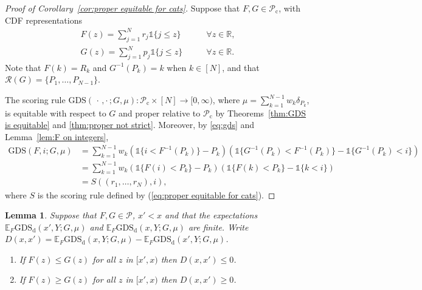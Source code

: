 \documentclass[10pt]{article} %
\theoremstyle{theorem}
\newtheorem{lem}{Lemma}
\theoremstyle{definition}
\newcommand{\RRR}{\mathbb{R}}
\newcommand{\EEE}{\mathbb{E}}
\newcommand{\one}{\mathds{1}}
\newcommand{\GDS}{\mathrm{GDS}}
\newcommand{\GDSd}{\mathrm{GDS}_\mathrm{d}}
\newcommand{\RG}{\mathcal{R}(G)}
\newcommand{\twocdots}{\,\cdot\,,\cdot\,}
\begin{document}
\begin{proof}[Proof of Corollary~\ref{cor:proper equitable for cats}]
Suppose that $F,G\in\mathcal{P}_\mathrm{c}$, with CDF representations
\begin{align*}
F(z)=\sum_{j=1}^N r_j\one\{j\leq z\} \qquad &\forall z\in \RRR, \\
G(z)=\sum_{j=1}^N p_j\one\{j\leq z\} \qquad &\forall z\in \RRR.
\end{align*}
Note that $F(k)=R_k$ and $G^{-1}(P_k)=k$ when $k\in [N]$, and that $\RG=\{P_1,\ldots,P_{N-1}\}$.

The scoring rule $\GDS(\twocdots;G,\mu):\mathcal{P}_\mathrm{c}\times[N]\to[0,\infty)$, where $\mu=\sum_{k=1}^{N-1} w_k\delta_{P_k}$, is equitable with respect to $G$ and proper relative to $\mathcal{P}_\mathrm{c}$ by Theorems~\ref{thm:GDS is equitable} and \ref{thm:proper not strict}. Moreover, by \eqref{eq:gds} and Lemma~\ref{lem:F on integers},
\begin{align*}
\GDS(F,i;G,\mu)
&=\sum_{k=1}^{N-1} w_k(\one\{i<F^{-1}(P_k)\} - P_k)(\one\{G^{-1}(P_k)<F^{-1}(P_k)\} - \one\{G^{-1}(P_k)<i\}) \\
&=\sum_{k=1}^{N-1} w_k(\one\{F(i)<P_k\} - P_k)(\one\{F(k)<P_k\} - \one\{k<i\}) \\
&=S((r_1,\ldots,r_N), i),
\end{align*}
where $S$ is the scoring rule defined by (\ref{eq:proper equitable for cats}).
\end{proof}


\begin{lem}\label{lem:D(x,x')}
Suppose that $F,G\in\mathcal{P}$, $x'<x$ and that the expectations $\EEE_F \GDSd(x',Y;G,\mu)$ and $\EEE_F \GDSd(x,Y;G,\mu)$ are finite. Write $D(x,x')=\EEE_F \GDSd(x,Y;G,\mu)-\EEE_F \GDSd(x',Y;G,\mu)$.
\begin{enumerate}
\item[(i)] If $F(z)\leq G(z)$ for all $z$ in $[x',x)$ then $D(x,x')\leq 0$.
\item[(ii)]  If $F(z)\geq G(z)$ for all $z$ in $[x',x)$ then $D(x,x')\geq 0$.
\end{enumerate}
\end{lem}
\end{document}
